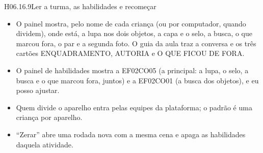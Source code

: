 \begin{historia}{H06.16.9}{Ler a turma, as habilidades e recomeçar}{\pronto}
\aceite
\begin{itemize}
  \item O painel mostra, pelo nome de cada criança (ou por computador, quando
    dividem), onde está, a lupa nos dois objetos, a capa e o selo, a busca, o
    que marcou fora, o par e a segunda foto. O guia da aula traz a conversa e
    os três cartões ENQUADRAMENTO, AUTORIA e O QUE FICOU DE FORA.
  \item O painel de habilidades mostra a EF02CO05 (a principal: a lupa, o
    selo, a busca e o que marcou fora, juntos) e a EF02CO01 (a busca dos
    objetos), e eu posso ajustar.
  \item Quem divide o aparelho entra pelas equipes da plataforma; o padrão é
    uma criança por aparelho.
  \item \enquote{Zerar} abre uma rodada nova com a mesma cena e apaga as
    habilidades daquela atividade.
\end{itemize}
\end{historia}

